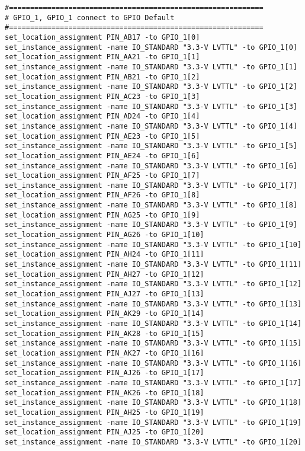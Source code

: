 \begin{verbatim}
#============================================================
# GPIO_1, GPIO_1 connect to GPIO Default
#============================================================
set_location_assignment PIN_AB17 -to GPIO_1[0]
set_instance_assignment -name IO_STANDARD "3.3-V LVTTL" -to GPIO_1[0]
set_location_assignment PIN_AA21 -to GPIO_1[1]
set_instance_assignment -name IO_STANDARD "3.3-V LVTTL" -to GPIO_1[1]
set_location_assignment PIN_AB21 -to GPIO_1[2]
set_instance_assignment -name IO_STANDARD "3.3-V LVTTL" -to GPIO_1[2]
set_location_assignment PIN_AC23 -to GPIO_1[3]
set_instance_assignment -name IO_STANDARD "3.3-V LVTTL" -to GPIO_1[3]
set_location_assignment PIN_AD24 -to GPIO_1[4]
set_instance_assignment -name IO_STANDARD "3.3-V LVTTL" -to GPIO_1[4]
set_location_assignment PIN_AE23 -to GPIO_1[5]
set_instance_assignment -name IO_STANDARD "3.3-V LVTTL" -to GPIO_1[5]
set_location_assignment PIN_AE24 -to GPIO_1[6]
set_instance_assignment -name IO_STANDARD "3.3-V LVTTL" -to GPIO_1[6]
set_location_assignment PIN_AF25 -to GPIO_1[7]
set_instance_assignment -name IO_STANDARD "3.3-V LVTTL" -to GPIO_1[7]
set_location_assignment PIN_AF26 -to GPIO_1[8]
set_instance_assignment -name IO_STANDARD "3.3-V LVTTL" -to GPIO_1[8]
set_location_assignment PIN_AG25 -to GPIO_1[9]
set_instance_assignment -name IO_STANDARD "3.3-V LVTTL" -to GPIO_1[9]
set_location_assignment PIN_AG26 -to GPIO_1[10]
set_instance_assignment -name IO_STANDARD "3.3-V LVTTL" -to GPIO_1[10]
set_location_assignment PIN_AH24 -to GPIO_1[11]
set_instance_assignment -name IO_STANDARD "3.3-V LVTTL" -to GPIO_1[11]
set_location_assignment PIN_AH27 -to GPIO_1[12]
set_instance_assignment -name IO_STANDARD "3.3-V LVTTL" -to GPIO_1[12]
set_location_assignment PIN_AJ27 -to GPIO_1[13]
set_instance_assignment -name IO_STANDARD "3.3-V LVTTL" -to GPIO_1[13]
set_location_assignment PIN_AK29 -to GPIO_1[14]
set_instance_assignment -name IO_STANDARD "3.3-V LVTTL" -to GPIO_1[14]
set_location_assignment PIN_AK28 -to GPIO_1[15]
set_instance_assignment -name IO_STANDARD "3.3-V LVTTL" -to GPIO_1[15]
set_location_assignment PIN_AK27 -to GPIO_1[16]
set_instance_assignment -name IO_STANDARD "3.3-V LVTTL" -to GPIO_1[16]
set_location_assignment PIN_AJ26 -to GPIO_1[17]
set_instance_assignment -name IO_STANDARD "3.3-V LVTTL" -to GPIO_1[17]
set_location_assignment PIN_AK26 -to GPIO_1[18]
set_instance_assignment -name IO_STANDARD "3.3-V LVTTL" -to GPIO_1[18]
set_location_assignment PIN_AH25 -to GPIO_1[19]
set_instance_assignment -name IO_STANDARD "3.3-V LVTTL" -to GPIO_1[19]
set_location_assignment PIN_AJ25 -to GPIO_1[20]
set_instance_assignment -name IO_STANDARD "3.3-V LVTTL" -to GPIO_1[20]

\end{verbatim}
